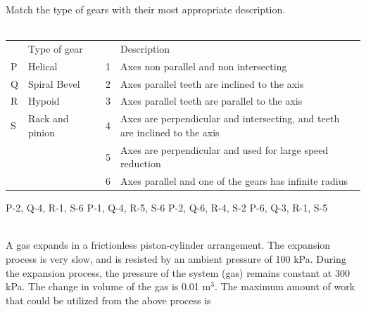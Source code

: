 \documentclass[addpoints,11pt]{exam}
\begin{document}
\begin{questions}
        \question Match the type of gears with their most appropriate description.\\\\
        \begin{tabular}{|p{0.2in}|p{1in}|p{0.2in}|p{0.2in}|p{3in}|}
            \hline
              & Type of gear    &  &   & Description                                                                 \\
            \cline{1-2}\cline{4-5}
            P & Helical         &  & 1 & Axes non parallel and non intersecting                                      \\
            \cline{1-2}\cline{4-5}
            Q & Spiral Bevel    &  & 2 & Axes parallel teeth are inclined to the axis                                \\
            \cline{1-2}\cline{4-5}
            R & Hypoid          &  & 3 & Axes parallel teeth are parallel to the axis                                \\
            \cline{1-2}\cline{4-5}
            S & Rack and pinion &  & 4 & Axes are perpendicular and intersecting, and teeth are inclined to the axis \\
            \cline{1-2}\cline{4-5}
              &                 &  & 5 & Axes are perpendicular and used for large speed reduction                   \\
            \cline{1-2}\cline{4-5}
              &                 &  & 6 & Axes parallel and one of the gears has infinite radius                      \\
            \cline{1-2}\cline{4-5}
        \end{tabular}

        \begin{oneparchoices}
            \choice P-2, Q-4, R-1, S-6
            \choice P-1, Q-4, R-5, S-6
            \choice P-2, Q-6, R-4, S-2
            \choice P-6, Q-3, R-1, S-5
        \end{oneparchoices}\\

        \question A gas expands in a frictionless piston-cylinder arrangement. The expansion process is very slow, and is resisted by an ambient pressure of 100 kPa. During the expansion process, the pressure of the system (gas) remains constant at 300 kPa. The change in volume of the gas is 0.01 m$^3$. The maximum amount of work that could be utilized from the above process is\\


\end{questions}
\end{document}
